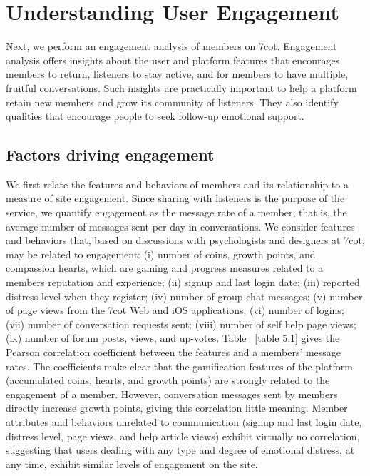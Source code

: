 \chapter{Understanding User Engagement}

Next, we perform an engagement analysis of members on 7cot. Engagement analysis offers insights about the user and platform features that encourages members to return, listeners to stay active, and for members to have multiple, fruitful conversations. Such insights are practically important to help a platform retain new members and grow its community of listeners. They also identify qualities that encourage people to seek follow-up emotional support.

\section {Factors driving engagement}

We first relate the features and behaviors of members and its relationship to a measure of site engagement. Since sharing with listeners is the purpose of the service, we quantify engagement as the message rate of a member, that is, the average number of messages sent per day in conversations. We consider features and behaviors that, based on discussions with psychologists and designers at 7cot, may be related to engagement: (i) number of coins, growth points, and compassion hearts, which are gaming and progress measures related to a members reputation and experience; (ii) signup and last login date; (iii) reported distress level when they register; (iv) number of group chat messages; (v) number of page views from the 7cot Web and iOS applications; (vi) number of logins; (vii) number of conversation requests sent; (viii) number of self help page views; (ix) number of forum posts, views, and up-votes. Table ~\ref{table 5.1} gives the Pearson correlation coefficient between the features and a members’ message rates. The coefficients make clear that the gamification features of the platform (accumulated coins, hearts, and growth points) are strongly related to the engagement of a member. However, conversation messages sent by members directly increase growth points, giving this correlation little meaning. Member attributes and behaviors unrelated to communication (signup and last login date, distress level, page views, and help article views) exhibit virtually no correlation, suggesting that users dealing with any type and degree of emotional distress, at any time, exhibit similar levels of engagement on the site. 

